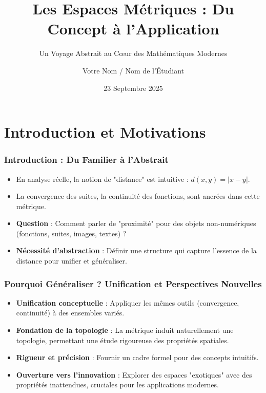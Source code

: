 \documentclass{beamer}
\title{\textbf{Les Espaces Métriques : Du Concept à l'Application}}
\subtitle{Un Voyage Abstrait au Cœur des Mathématiques Modernes}
\author{Votre Nom / Nom de l'Étudiant}
\institute{Université Galatasaray, Département de Mathématiques}
\date{23 Septembre 2025}
\begin{document}
\frame{\titlepage}

\section*{Introduction et Motivations}
\begin{frame}
    \frametitle{Introduction : Du Familier à l'Abstrait}
    \begin{itemize}
        \item En analyse réelle, la notion de "distance" est intuitive : $d(x,y) = |x-y|$.
        \item La convergence des suites, la continuité des fonctions, sont ancrées dans cette métrique.
        \item \textbf{Question} : Comment parler de "proximité" pour des objets non-numériques (fonctions, suites, images, textes) ?
        \item \textbf{Nécessité d'abstraction} : Définir une structure qui capture l'essence de la distance pour unifier et généraliser.
    \end{itemize}
\end{frame}

\begin{frame}
    \frametitle{Pourquoi Généraliser ? Unification et Perspectives Nouvelles}
    \begin{itemize}
        \item \textbf{Unification conceptuelle} : Appliquer les mêmes outils (convergence, continuité) à des ensembles variés.
        \item \textbf{Fondation de la topologie} : La métrique induit naturellement une topologie, permettant une étude rigoureuse des propriétés spatiales.
        \item \textbf{Rigueur et précision} : Fournir un cadre formel pour des concepts intuitifs.
        \item \textbf{Ouverture vers l'innovation} : Explorer des espaces "exotiques" avec des propriétés inattendues, cruciales pour les applications modernes.
    \end{itemize}
\end{frame}

\end{document}
